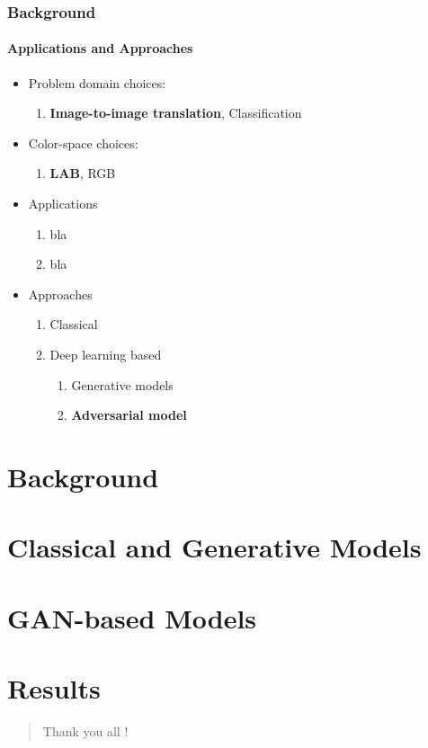 \documentclass{beamer}
\begin{document}
\begin{frame}
\frametitle{\textbf{Background}}
\framesubtitle{\textbf{Applications and Approaches}}
\begin{itemize}
  \item Problem domain choices:
  
	\begin{enumerate}[$-$]
	\item  \textbf{Image-to-image translation}, Classification
	\end{enumerate}
	
	\item Color-space choices:
  
	\begin{enumerate}[$-$]
	\item  \textbf{LAB}, RGB
	\end{enumerate}
	
	
\end{itemize}

\begin{itemize}
  \item Applications
  
	\begin{enumerate}[$-$]
	\item  bla
	 \item bla
	\end{enumerate}
	
	\item Approaches
  
	\begin{enumerate}[$-$]
	\item Classical
	\item Deep learning based
	\begin{enumerate}[$-$]
	  \item Generative models
	  \item \textbf{Adversarial model}
	\end{enumerate}	 
	\end{enumerate}
	
\end{itemize}
\end{frame}


\section*{Background}

\section*{Classical and Generative Models}

\section*{GAN-based Models}

\section*{Results}



\begin{frame}
\begin{quote}
\begin{center}
\huge{Thank you all !} \\

\end{center}   
\end{quote}
\end{frame}
\end{document}
